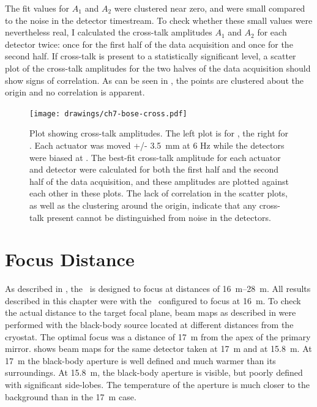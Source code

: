 The fit values for $A_1$ and $A_2$ were clustered near zero, and were small compared to the noise in the detector timestream.
To check whether these small values were nevertheless real, I calculated the cross-talk amplitudes $A_1$ and $A_2$ for each detector twice: once for the first half of the data acquisition and once for the second half.
If cross-talk is present to a statistically significant level, a scatter plot of the cross-talk amplitudes for the two halves of the data acquisition should show signs of correlation.
As can be seen in , the points are clustered about the origin and no correlation is apparent.

\begin{figure}
\centering
\texttt{[image: drawings/ch7-bose-cross.pdf]}
\caption[Plot showing cross-talk amplitudes]{
Plot showing cross-talk amplitudes.
The left plot is for , the right for .
Each actuator was moved +/- \SI{3.5}{\mm} at 6 Hz while the detectors were biased at \SOC.
The best-fit cross-talk amplitude for each actuator and detector were calculated for both the first half and the second half of the data acquisition, and these amplitudes are plotted against each other in these plots.
The lack of correlation in the scatter plots, as well as the clustering around the origin, indicate that any cross-talk present cannot be distinguished from noise in the detectors.
}
\label{fig:ch7-bose-cross}
\end{figure}

\section{Focus Distance}\label{sec:ch7-focus-distance}

As described in , the \Imager\ is designed to focus at distances of \SIrange{16}{28}{\m}.
All results described in this chapter were with the \Imager\ configured to focus at 16~m.
To check the actual distance to the target focal plane, beam maps as described in  were performed with the black-body source located at different distances from the cryostat.
The optimal focus was a distance of \SI{17}{\m} from the apex of the primary mirror.
 shows beam maps for the same detector taken at \SI{17}{\m} and at \SI{15.8}{\m}.
At \SI{17}{\m} the black-body aperture is well defined and much warmer than its surroundings.
At \SI{15.8}{\m}, the black-body aperture is visible, but poorly defined with significant side-lobes.
The temperature of the aperture is much closer to the background than in the \SI{17}{\m} case.

